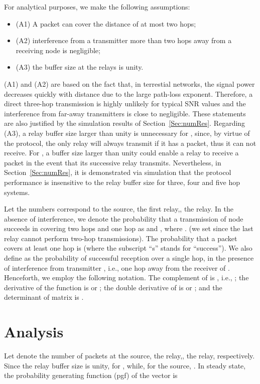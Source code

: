 \documentclass[draftclsnofoot,10pt,onecolumn,letterpaper]{IEEEtran}
\begin{document}
For analytical purposes, we make the following assumptions: 
\begin{itemize}
 \item (A1) A packet can cover the distance of at most two hops;
 \item (A2) interference from a transmitter more than two hops away from a receiving node is negligible;
 \item (A3) the buffer size at the relays is unity.
\end{itemize}
(A1) and (A2) are based on the fact that, in terrestial networks, the signal power decreases quickly with distance due to the large path-loss exponent. Therefore, a direct three-hop transmission is highly unlikely for typical SNR values and the interference from far-away transmitters is close to negligible.
These statements are also justified by the simulation results of Section~\ref{Sec:numRes}. Regarding (A3), a relay buffer size larger than unity is unnecessary for , since, by virtue of the protocol, the only relay will always transmit if it has a packet, thus it can not receive. For , a buffer size larger than unity 
could enable a relay to receive a packet in the event that its successive relay transmits. Nevertheless, in Section~\ref{Sec:numRes}, it is demonstrated via simulation that
the protocol performance is insensitive to the relay buffer size for three, four and five hop systems.

Let the numbers  correspond to the source, the first relay,, the  relay. 
In the absence of interference, we denote the probability that a transmission of node  succeeds in covering two hops and one hop as  and , where .
(we set  since the last relay cannot perform two-hop transmissions). 
The probability that a packet covers at least one hop is  (where the subscript
``s'' stands for ``success''). We also define  as the probability of successful reception over a single hop, in the presence of 
interference from transmitter , i.e., one hop away from the receiver of . 
Henceforth, we employ the following notation. The complement of  is , i.e., ; the derivative of the function  is  or ; the double derivative of  is  or ; and the determinant of matrix  is .


\section{Analysis}
\label{Sec:anal}

Let  denote the number of packets at the source, the  relay,, the  relay, respectively.
Since the relay buffer size is unity,  for , while, for the source, .
In steady state, the probability generating function (pgf) of the vector  is
\end{document}
